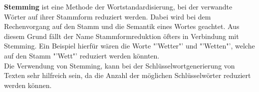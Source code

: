 			\textbf{Stemming} ist eine Methode der Wortstandardisierung, bei der verwandte Wörter auf ihrer Stammform reduziert werden. Dabei wird bei dem Rechenvorgang auf den Stamm und die Semantik eines Wortes geachtet. Aus diesem Grund fällt der Name Stammformreduktion öfters in Verbindung mit Stemming.\cite{eldesouki2009stemming} Ein Beispiel hierfür wären die Worte "'Wetter"' und "'Wetten"', welche auf den Stamm "'Wett"' reduziert werden könnten. \cite{philippmulti}\\ 
			Die Verwendung von Stemming, kann bei der Schlüsselwortgenerierung von Texten sehr hilfreich sein, da die Anzahl der möglichen Schlüsselwörter reduziert werden können.


